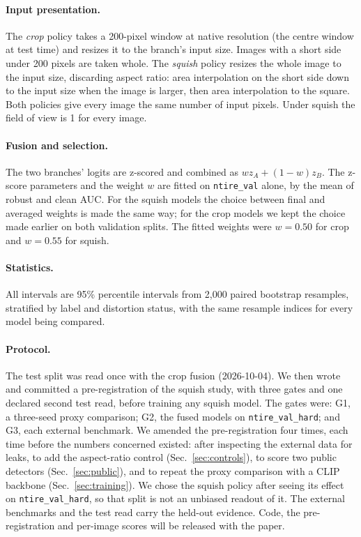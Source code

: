 \documentclass[letterpaper]{article} %
\begin{document}
\paragraph{Input presentation.} The \emph{crop} policy takes a 200-pixel
window at native resolution (the centre window at test time) and resizes it to
the branch's input size. Images with a short side under 200 pixels are taken
whole. The \emph{squish} policy resizes the whole image to the input size,
discarding aspect ratio: area interpolation on the short side down to the input
size when the image is larger, then area interpolation to the square. Both
policies give every image the same number of input pixels. Under squish the
field of view is 1 for every image.

\paragraph{Fusion and selection.} The two branches' logits are z-scored and
combined as $w z_A + (1-w) z_B$. The z-score parameters and the weight $w$ are
fitted on \texttt{ntire\_val} alone, by the mean of robust and clean AUC. For
the squish models the choice between final and averaged weights is made the
same way; for the crop models we kept the choice made earlier on both
validation splits. The fitted weights were $w = 0.50$ for crop and $w = 0.55$
for squish.

\paragraph{Statistics.} All intervals are 95\% percentile intervals from 2,000
paired bootstrap resamples, stratified by label and distortion status, with
the same resample indices for every model being compared.

\paragraph{Protocol.} The test split was read once with the crop fusion
(2026-10-04). We then wrote and committed a pre-registration of the squish
study, with three gates and one declared second test read, before training any
squish model. The gates were: G1, a three-seed proxy comparison; G2, the
fused models on \texttt{ntire\_val\_hard}; and G3, each external benchmark. We
amended the pre-registration four times, each time before the numbers
concerned existed: after inspecting the external data for leaks, to add the
aspect-ratio control (Sec.~\ref{sec:controls}), to score two public detectors
(Sec.~\ref{sec:public}), and to repeat the proxy comparison with a CLIP
backbone (Sec.~\ref{sec:training}). We chose the squish
policy after seeing its effect on \texttt{ntire\_val\_hard}, so that split is
not an unbiased readout of it. The external benchmarks and the test read
carry the held-out evidence. Code, the pre-registration and per-image scores
will be released with the paper.
\end{document}
